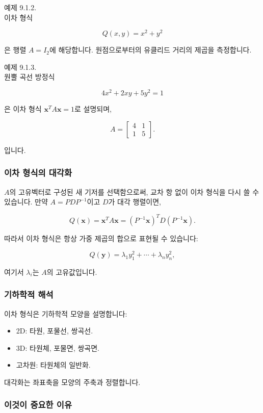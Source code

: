 \documentclass[
  12pt,
  a4paper,
]{article}
\begin{document}
예제 9.1.2.\\
이차 형식

\[Q(x,y) = x^2 + y^2\]

은 행렬 \(A = I_2\)에 해당합니다. 원점으로부터의 유클리드 거리의 제곱을 측정합니다.

예제 9.1.3.\\
원뿔 곡선 방정식

\[4x^2 + 2xy + 5y^2 = 1\]

은 이차 형식 \(\mathbf{x}^T A \mathbf{x} = 1\)로 설명되며,

\[A = \begin{bmatrix}
4 & 1 \\
1 & 5
\end{bmatrix}.\]

입니다.

\subsubsection{이차 형식의 대각화}\label{diagonalization-of-quadratic-forms}

\(A\)의 고유벡터로 구성된 새 기저를 선택함으로써, 교차 항 없이 이차 형식을 다시 쓸 수 있습니다. 만약 \(A = PDP^{-1}\)이고 \(D\)가 대각 행렬이면,

\[Q(\mathbf{x}) = \mathbf{x}^T A \mathbf{x} = (P^{-1}\mathbf{x})^T D (P^{-1}\mathbf{x}).\]

따라서 이차 형식은 항상 가중 제곱의 합으로 표현될 수 있습니다:

\[Q(\mathbf{y}) = \lambda_1 y_1^2 + \cdots + \lambda_n y_n^2,\]

여기서 \(\lambda_i\)는 \(A\)의 고유값입니다.

\subsubsection{기하학적 해석}\label{geometric-interpretation-20}

이차 형식은 기하학적 모양을 설명합니다:

\begin{itemize}
\item
  2D: 타원, 포물선, 쌍곡선.
\item
  3D: 타원체, 포물면, 쌍곡면.
\item
  고차원: 타원체의 일반화.
\end{itemize}

대각화는 좌표축을 모양의 주축과 정렬합니다.

\subsubsection{이것이 중요한 이유}\label{why-this-matters-32}
\end{document}
